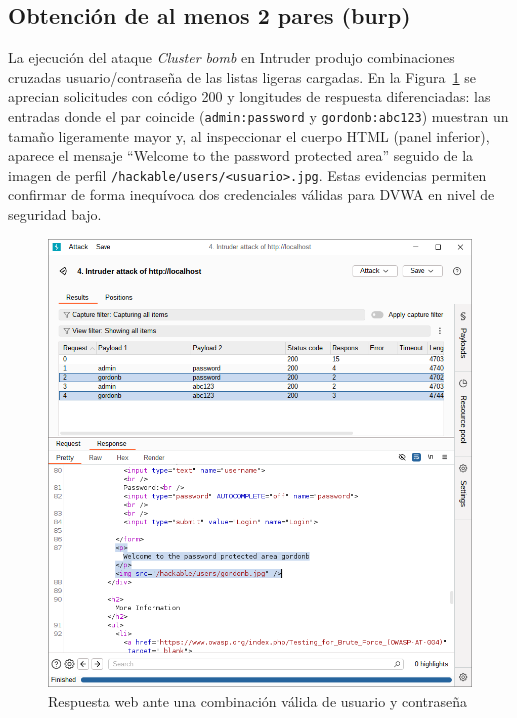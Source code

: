 \documentclass[letterpaper,12pt]{article}
\let\origsubsection\subsection
\renewcommand{\subsection}{\FloatBarrier\origsubsection}
\begin{document}
\subsection{Obtención de al menos 2 pares (burp)}
La ejecución del ataque \emph{Cluster bomb} en Intruder produjo combinaciones cruzadas usuario/contraseña de las listas ligeras cargadas. En la Figura~\ref{fig:ventanaintruderdoble} se aprecian solicitudes con código 200 y longitudes de respuesta diferenciadas: las entradas donde el par coincide (\texttt{admin:password} y \texttt{gordonb:abc123}) muestran un tamaño ligeramente mayor y, al inspeccionar el cuerpo HTML (panel inferior), aparece el mensaje ``Welcome to the password protected area'' seguido de la imagen de perfil \texttt{/hackable/users/<usuario>.jpg}. Estas evidencias permiten confirmar de forma inequívoca dos credenciales válidas para DVWA en nivel de seguridad bajo.
\begin{figure}
    \centering
    \includegraphics[width=1\linewidth]{Captura desde 2025-10-03 01-09-41.png}
    \caption{Respuesta web ante una combinación válida de usuario y contraseña}
    \label{fig:ventanaintruderdoble}
\end{figure}
\end{document}
